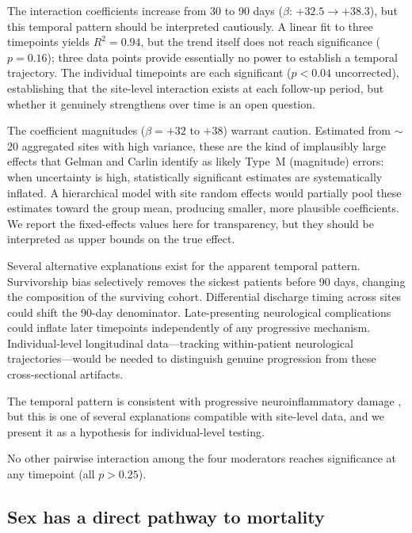 \documentclass{article}
\begin{document}
The interaction coefficients increase from 30 to 90 days ($\beta$: $+32.5 \to +38.3$), but this temporal pattern should be interpreted cautiously.
A linear fit to three timepoints yields $R^2 = 0.94$, but the trend itself does not reach significance ($p = 0.16$); three data points provide essentially no power to establish a temporal trajectory.
The individual timepoints are each significant ($p < 0.04$ uncorrected), establishing that the site-level interaction exists at each follow-up period, but whether it genuinely strengthens over time is an open question.

The coefficient magnitudes ($\beta = +32$ to $+38$) warrant caution.  Estimated from $\sim$20 aggregated sites with high variance, these are the kind of implausibly large effects that Gelman and Carlin \cite{gelman2014typeMS} identify as likely Type~M (magnitude) errors: when uncertainty is high, statistically significant estimates are systematically inflated.  A hierarchical model with site random effects would partially pool these estimates toward the group mean, producing smaller, more plausible coefficients.  We report the fixed-effects values here for transparency, but they should be interpreted as upper bounds on the true effect.

Several alternative explanations exist for the apparent temporal pattern.
Survivorship bias selectively removes the sickest patients before 90 days, changing the composition of the surviving cohort.
Differential discharge timing across sites could shift the 90-day denominator.
Late-presenting neurological complications could inflate later timepoints independently of any progressive mechanism.
Individual-level longitudinal data---tracking within-patient neurological trajectories---would be needed to distinguish genuine progression from these cross-sectional artifacts.

The temporal pattern is consistent with progressive neuroinflammatory damage \cite{douaud2022brain, nalbandian2021pasc}, but this is one of several explanations compatible with site-level data, and we present it as a hypothesis for individual-level testing.

No other pairwise interaction among the four moderators reaches significance at any timepoint (all $p > 0.25$).


\subsection{Sex has a direct pathway to mortality}
\end{document}
